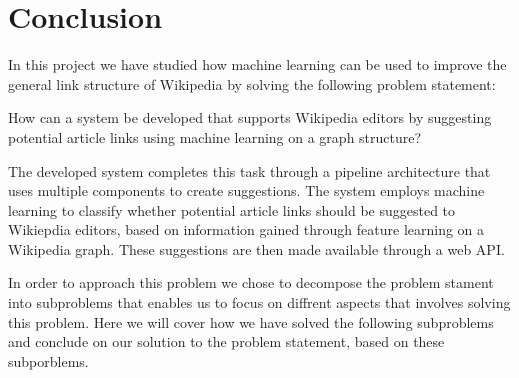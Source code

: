 \chapter{Conclusion}\label{chap:conclusion}
In this project we have studied how machine learning can be used to improve the general link structure of Wikipedia by solving the following problem statement:
\vspace{1ex} %
\begin{formal}
How can a system be developed that supports Wikipedia editors by suggesting potential article links using machine learning on a graph structure?
\end{formal}

The developed system completes this task through a pipeline architecture that uses multiple components to create suggestions. The system employs machine learning to classify whether potential article links should be suggested to Wikiepdia editors, based on information gained through feature learning on a Wikipedia graph. These suggestions are then made available through a web API.

In order to approach this problem we chose to decompose the problem stament into subproblems that enables us to focus on diffrent aspects that involves solving this problem. Here we will cover how we have solved the following subproblems and conclude on our solution to the problem statement, based on these subporblems.

